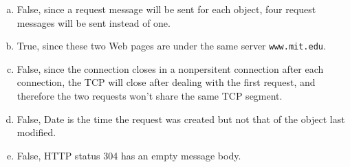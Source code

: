 \begin{pr}$ $
\begin{enumerate}[a.]
\item False, since a request message will be sent for each object, four request messages will be sent instead of one.
\item True, since these two Web pages are under the same server \texttt{www.mit.edu}.
\item False, since the connection closes in a nonpersitent connection after each connection, the TCP will close after dealing with the first request, and therefore the two requests won't share the same TCP segment.
\item False, Date is the time the request was created but not that of the object last modified.
\item False, HTTP status 304 has an empty message body.
\end{enumerate}
\end{pr}
